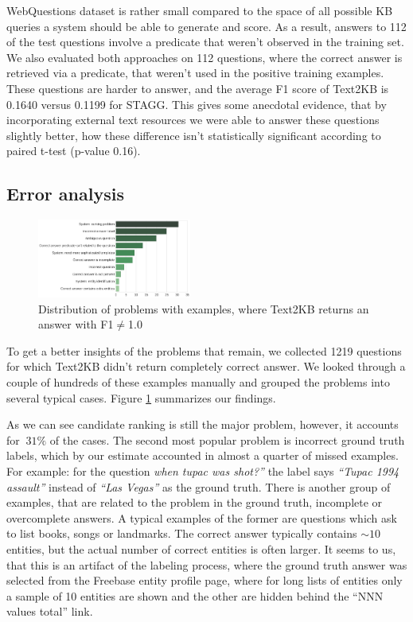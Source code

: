 WebQuestions dataset is rather small compared to the space of all possible KB queries a system should be able to generate and score.
As a result, answers to 112 of the test questions involve a predicate that weren't observed in the training set.
We also evaluated both approaches on 112 questions, where the correct answer is retrieved via a predicate, that weren't used in the positive training examples.
These questions are harder to answer, and the average F1 score of Text2KB is 0.1640 versus 0.1199 for STAGG.
This gives some anecdotal evidence, that by incorporating external text resources we were able to answer these questions slightly better, how these difference isn't statistically significant according to paired t-test (p-value 0.16).

\subsection{Error analysis}

\begin{figure}
\centering
\includegraphics[width=0.45\textwidth]{img/error_analysis}
\caption{Distribution of problems with examples, where Text2KB returns an answer with F1$\neq$1.0}
\label{fig:error_analysis}
\end{figure}

To get a better insights of the problems that remain, we collected 1219 questions for which Text2KB didn't return completely correct answer.
We looked through a couple of hundreds of these examples manually and grouped the problems into several typical cases.
Figure \ref{fig:error_analysis} summarizes our findings.

As we can see candidate ranking is still the major problem, however, it accounts for $~31\%$ of the cases.
The second most popular problem is incorrect ground truth labels, which by our estimate accounted in almost a quarter of missed examples.
For example: for the question \textit{when tupac was shot?''} the label says \textit{``Tupac 1994 assault''} instead of \textit{``Las Vegas''} as the ground truth.
There is another group of examples, that are related to the problem in the ground truth, \ie incomplete or overcomplete answers.
A typical examples of the former are questions which ask to list books, songs or landmarks.
The correct answer typically contains $\sim10$ entities, but the actual number of correct entities is often larger.
It seems to us, that this is an artifact of the labeling process, where the ground truth answer was selected from the Freebase entity profile page, where for long lists of entities only a sample of 10 entities are shown and the other are hidden behind the ``NNN values total'' link.

